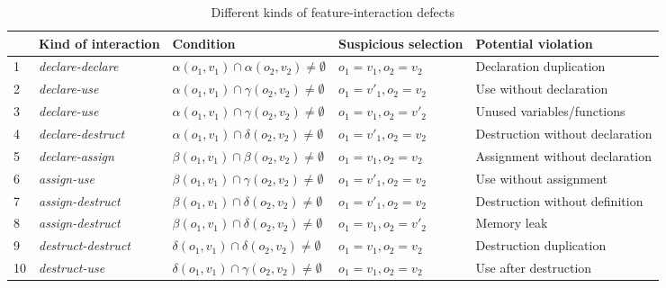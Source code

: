 \begin{table*}[!h]
\centering
\caption{Different kinds of feature-interaction defects}
\label{bugtypes}
\begin{tabular}{|l|l|l|l|l|}
\hline
&Kind of interaction & Condition & Suspicious selection & Potential violation \\ \hline

1&\textit{declare-declare}&$\alpha(o_1, v_1) \cap \alpha(o_2, v_2) \neq \emptyset$ &$o_1=v_1, o_2=v_2$&Declaration duplication\\ \hline
2&\textit{declare-use}&$\alpha(o_1, v_1) \cap \gamma(o_2, v_2) \neq \emptyset$&$o_1=v'_1, o_2=v_2$&Use without declaration\\ \hline
3&\textit{declare-use}&$\alpha(o_1, v_1) \cap \gamma(o_2, v_2) \neq \emptyset$&$o_1=v_1, o_2=v'_2$&Unused variables/functions\\ \hline
4&\textit{declare-destruct}&$\alpha(o_1, v_1) \cap \delta(o_2, v_2) \neq \emptyset$ &$o_1=v'_1, o_2=v_2$&Destruction without declaration\\ \hline
5&\textit{declare-assign}&$\beta(o_1, v_1) \cap \beta(o_2, v_2) \neq \emptyset$&$o_1=v_1, o_2=v_2$&Assignment without declaration\\ \hline
6&\textit{assign-use}&$\beta(o_1, v_1) \cap \gamma(o_2, v_2) \neq \emptyset$&$o_1=v'_1, o_2=v_2$&Use without assignment\\ \hline
7&\textit{assign-destruct}&$\beta(o_1, v_1) \cap \delta(o_2, v_2) \neq \emptyset$&$o_1=v'_1, o_2=v_2$&Destruction without definition\\ \hline
8&\textit{assign-destruct}&$\beta(o_1, v_1) \cap \delta(o_2, v_2) \neq \emptyset$&$o_1=v_1, o_2=v'_2$&Memory leak\\ \hline
9&\textit{destruct-destruct}&$\delta(o_1, v_1) \cap \delta(o_2, v_2) \neq \emptyset$&$o_1=v_1, o_2=v_2$&Destruction duplication\\ \hline
10&\textit{destruct-use}&$\delta(o_1, v_1) \cap \gamma(o_2, v_2) \neq \emptyset$&$o_1=v_1, o_2=v_2$& Use after destruction\\ \hline
\end{tabular}
\end{table*}
